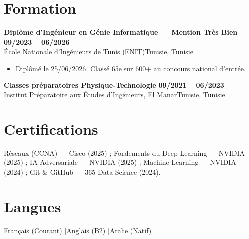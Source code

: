 \documentclass[a4paper,9pt]{article}
\newcommand{\cventry}[4]{\textbf{#1} \hfill \textbf{#4}\\[0.2pt]#2{\ifx\relax#3\relax\else, #3\fi}\par\vspace{0.3pt}}
\begin{document}
\section{Formation}
\cventry{Diplôme d'Ingénieur en Génie Informatique --- Mention Très Bien}{École Nationale d'Ingénieurs de Tunis (ENIT)}{Tunisie}{09/2023 -- 06/2026}
\begin{itemize}
  \item Diplômé le 25/06/2026. Classé 65e sur 600+ au concours national d'entrée.
\end{itemize}
\cventry{Classes préparatoires Physique-Technologie}{Institut Préparatoire aux Études d'Ingénieurs, El Manar}{Tunisie}{09/2021 -- 06/2023}
\section{Certifications}
Réseaux (CCNA) --- Cisco (2025) ; Fondements du Deep Learning --- NVIDIA (2025) ; IA Adversariale --- NVIDIA (2025) ; Machine Learning --- NVIDIA (2024) ; Git \& GitHub --- 365 Data Science (2024).
\section{Langues}
Français (Courant) \quad|\quad Anglais (B2) \quad|\quad Arabe (Natif)
\end{document}
